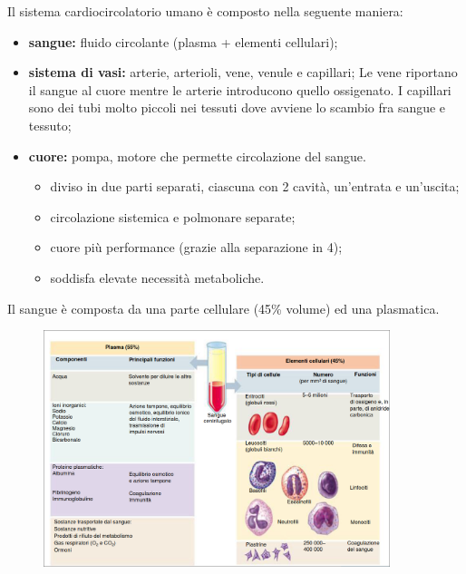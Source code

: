 \documentclass[a4paper]{article}
\begin{document}
Il sistema cardiocircolatorio umano è composto nella seguente maniera:
\begin{itemize}
    \item \textbf{sangue:} fluido circolante (plasma + elementi cellulari);
    \item \textbf{sistema di vasi:} arterie, arterioli, vene, venule e capillari;
        Le vene riportano il sangue al cuore mentre le arterie introducono quello ossigenato.
        I capillari sono dei tubi molto piccoli nei tessuti dove avviene lo scambio fra sangue e tessuto;
    \item \textbf{cuore:} pompa, motore che permette circolazione del sangue.
        \begin{itemize}
            \item diviso in due parti separati, ciascuna con 2 cavità, un'entrata e un'uscita;
            \item circolazione sistemica e polmonare separate;
            \item cuore più performance (grazie alla separazione in 4);
            \item soddisfa elevate necessità metaboliche.
        \end{itemize}
\end{itemize}

\pagebreak

Il sangue è composta da una parte cellulare (45\% volume) ed una plasmatica.
\begin{center}
\begin{figure}[th]
    \centering
    \includegraphics[width=0.9\textwidth]{./blood_composition.png}
\end{figure}
\end{center}
\end{document}

